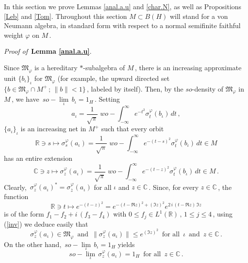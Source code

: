 \documentclass[reqno]{amsart}
\theoremstyle{definition}
\theoremstyle{remark}
\numberwithin{equation}{section}
\theoremstyle{plain}
\begin{document}
In this section we prove Lemmas \ref{anal.a.u} and \ref{char.N},
as well as Propositions \ref{Leb} and \ref{Tom}. Throughout this
section $M\subset B(H)$ will stand for a von Neumann algebra, in
standard form with respect to a normal semifinite faithful weight
$\varphi$ on $M\,$.
\medskip

{\it Proof of }$\,${\bf Lemma \ref{anal.a.u}}.
\medskip

Since $\mathfrak M_\varphi$ is a hereditary $*$-subalgebra of $M\,$,
there is an increasing approximate unit $\{ b_\iota\}_\iota$ for
$\mathfrak M_\varphi$ (for example, the upward directed set
$\{ b\in\mathfrak M_\varphi\cap M^+\, ;\,\| b\| <1\}\,$, labeled by
itself). Then, by the $so$-density of $\mathfrak M_\varphi$ in
$M\,$, we have $\, so-\lim\limits_\iota\, b_\iota =1_H\,$. Setting
\begin{equation*}
a_\iota =\frac 1{\sqrt \pi}\; wo-\int_{-\infty}^\infty e^{-t^2}
\sigma^\varphi_t (b_\iota )\, dt\, ,
\end{equation*}
$\{ a_\iota\}_\iota$ is an increasing net in $M^+$ such that every
orbit
\begin{equation*}
\mathbb R\ni s\longmapsto \sigma^\varphi_s (a_\iota ) =
\frac 1{\sqrt \pi}\; wo-\int_{-\infty}^\infty e^{-(t-s)^2}
\sigma^\varphi_t (b_\iota )\, dt\in M
\end{equation*}
has an entire extension
\begin{equation*}
\mathbb C\ni z\longmapsto \sigma^\varphi_z (a_\iota ) =
\frac 1{\sqrt \pi}\; wo-\int_{-\infty}^\infty e^{-(t-z)^2}
\sigma^\varphi_t (b_\iota )\, dt\in M\, .
\end{equation*}
Clearly, $\,\sigma^\varphi_z (a_\iota )^* =
\sigma^\varphi_{\overline{z}} (a_\iota )$ for all $\iota$ and
$z\in\mathbb C\,$.
Since, for every $z\in\mathbb C\,$, the function
\begin{equation*}
\mathbb R\ni t\longmapsto
e^{-(t-z)^2}=e^{-(t-\Re z)^2 +(\Im z)^2} e^{2\, i\, (t-\Re z)\,\Im z}
\end{equation*}
is of the form $f_1-f_2+i\, (f_3-f_4)$ with $0\leq f_j\in
L^1(\mathbb R )\, ,\, 1\leq j\leq 4\,$, using (\ref{inv}) we deduce
easily that
\begin{equation*}
\sigma^\varphi_z (a_\iota )\in\mathfrak M_\varphi\,\text{ and }\,
\| \sigma^\varphi_z (a_\iota )\|\leq e^{(\Im z)^2}\,\text{ for all }
\,\iota\,\text{ and }\, z\in\mathbb C\, .
\end{equation*}
On the other hand, $\, so-\lim\limits_\iota\, b_\iota =1_H$
yields
\begin{equation*}
so-\lim\limits_\iota\, \sigma^\varphi_z (a_\iota ) =1_H\,\text{ for
all }\, z\in\mathbb C\, .
\end{equation*}
\end{document}
